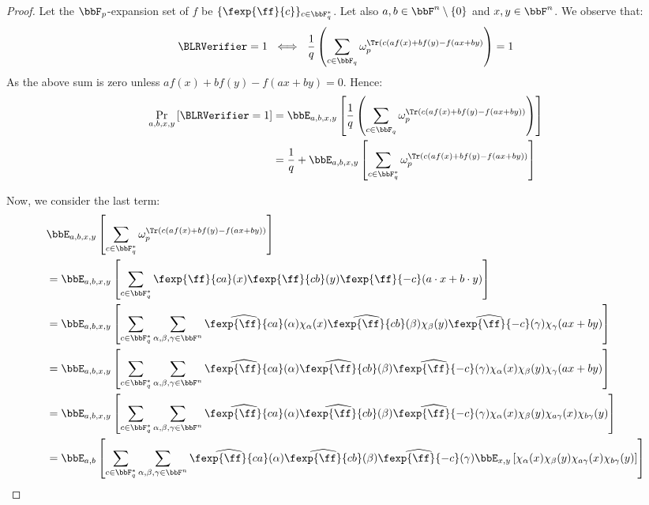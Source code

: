 \begin{proof}
Let the $\bbF_p$-expansion set of $f$ be $\{\fexp{\ff}{c}\}_{c\in\bbF_q^{*}}$.
Let also $a,b\in\bbF^n\setminus\{0\}$ and $x,y\in\bbF^n$. We observe that:
\[
\BLRVerifier=1  \ \iff \ \frac{1}{q}\left(\sum_{c\in\bbF_q}\omega_p^{\Tr(c(af(x)+bf(y)-f(ax+by)}\right) = 1
\]
As the above sum is zero unless $af(x)+bf(y)-f(ax+by) = 0$. Hence:
\begin{align*}
\Pr_{a,b,x,y}\left[\BLRVerifier=1\right]&=\bbE_{a,b,x,y}\left[\frac{1}{q}\left(\sum_{c\in\bbF_q}\omega_p^{\Tr(c(af(x)+bf(y)-f(ax+by))}\right)\right]\\
&= \frac{1}{q}+\bbE_{a,b,x,y}\left[\sum_{c\in\bbF_q^{*}}\omega_p^{\Tr(c(af(x)+bf(y)-f(ax+by))}\right]
\end{align*}

Now, we consider the last term:
\begin{align*}
&\bbE_{a,b,x,y}\left[\sum_{c\in\bbF_q^{*}}\omega_p^{\Tr(c(af(x)+bf(y)-f(ax+by))}\right] \\&= \bbE_{a,b,x,y}\left[\sum_{c\in\bbF_q^{*}}\fexp{\ff}{ca}(x)\fexp{\ff}{cb}(y)\fexp{\ff}{-c}(a\cdot x+b\cdot y)\right]\\
&=\bbE_{a,b,x,y}\left[\sum_{c\in\bbF_q^{*}}\sum_{\alpha,\beta,\gamma\in\bbF^n}\widehat{\fexp{\ff}{ca}}(\alpha)\chi_{\alpha}(x)\widehat{\fexp{\ff}{cb}}(\beta)\chi_{\beta}(y)\widehat{\fexp{\ff}{-c}}(\gamma)\chi_{\gamma}(ax+by)\right]\\
&= \bbE_{a,b,x,y}\left[\sum_{c\in\bbF_q^{*}}\sum_{\alpha,\beta,\gamma\in\bbF^n}\widehat{\fexp{\ff}{ca}}(\alpha)\widehat{\fexp{\ff}{cb}}(\beta)\widehat{\fexp{\ff}{-c}}(\gamma)\chi_{\alpha}(x)\chi_{\beta}(y)\chi_{\gamma}(ax+by)\right]\\
&= \bbE_{a,b,x,y}\left[\sum_{c\in\bbF_q^{*}}\sum_{\alpha,\beta,\gamma\in\bbF^n}\widehat{\fexp{\ff}{ca}}(\alpha)\widehat{\fexp{\ff}{cb}}(\beta)\widehat{\fexp{\ff}{-c}}(\gamma)\chi_{\alpha}(x)\chi_{\beta}(y)\chi_{a\gamma}(x)\chi_{b\gamma}(y)\right]\\
&= \bbE_{a,b}\left[\sum_{c\in\bbF_q^{*}}\sum_{\alpha,\beta,\gamma\in\bbF^n}\widehat{\fexp{\ff}{ca}}(\alpha)\widehat{\fexp{\ff}{cb}}(\beta)\widehat{\fexp{\ff}{-c}}(\gamma)\bbE_{x,y}\left[\chi_{\alpha}(x)\chi_{\beta}(y)\chi_{a\gamma}(x)\chi_{b\gamma}(y)\right]\right]
\end{align*}


\end{proof}
